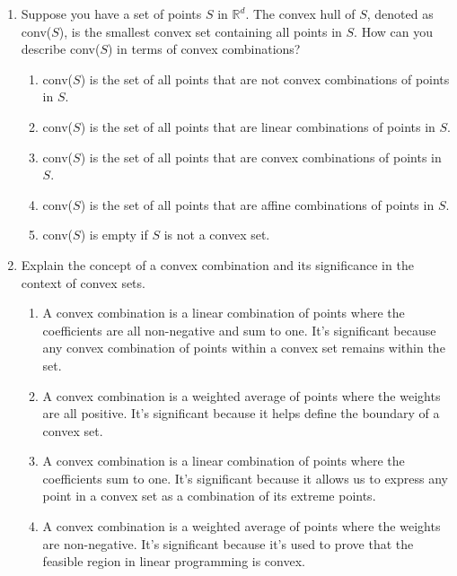 \documentclass{article}%
\begin{document}
\begin{enumerate}
\begin{enumerate}
\item A point on the line passing through the two points, but outside the line segment connecting them.%
\item Any point on the line passing through the two points.%
\item A point on the line segment connecting the two points.%
\item A point that is equidistant from the two points.%
\end{enumerate}%
\vspace{1em}%
\item Suppose you have a set of points $S$ in $\mathbb{R}^d$.  The convex hull of $S$, denoted as conv($S$), is the smallest convex set containing all points in $S$. How can you describe conv($S$) in terms of convex combinations?%
\begin{enumerate}%
\item conv($S$) is the set of all points that are not convex combinations of points in $S$.%
\item conv($S$) is the set of all points that are linear combinations of points in $S$.%
\item conv($S$) is the set of all points that are convex combinations of points in $S$.%
\item conv($S$) is the set of all points that are affine combinations of points in $S$.%
\item conv($S$) is empty if $S$ is not a convex set.%
\end{enumerate}%
\vspace{1em}%
\item Explain the concept of a convex combination and its significance in the context of convex sets.%
\begin{enumerate}%
\item A convex combination is a linear combination of points where the coefficients are all non-negative and sum to one.  It's significant because any convex combination of points within a convex set remains within the set.%
\item A convex combination is a weighted average of points where the weights are all positive. It's significant because it helps define the boundary of a convex set.%
\item A convex combination is a linear combination of points where the coefficients sum to one. It's significant because it allows us to express any point in a convex set as a combination of its extreme points.%
\item A convex combination is a weighted average of points where the weights are non-negative. It's significant because it's used to prove that the feasible region in linear programming is convex.%

\end{enumerate}
\end{enumerate}
\end{document}
